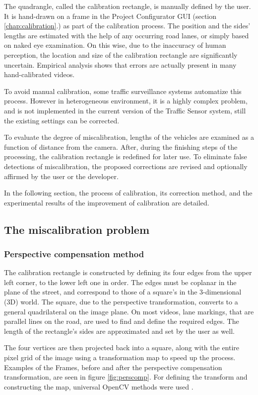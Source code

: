 The quadrangle, called the calibration rectangle, is manually defined by the user.
It is hand-drawn on a frame in the Project Configurator GUI (section \ref{chap:calibration}.) as part of the calibration process.
The position and the sides' lengths are estimated with the help of any occurring road lanes, or simply based on naked eye examination.
On this wise, due to the inaccuracy of human perception, the location and size of the calibration rectangle are significantly uncertain.
Empirical analysis shows that errors are actually present in many hand-calibrated videos.

To avoid manual calibration, some traffic surveillance systems automatize this process.
However in heterogeneous environment, it is a highly complex problem, and is not implemented in the current version of the Traffic Sensor system, still the existing settings can be corrected.

To evaluate the degree of miscalibration, lengths of the vehicles are examined as a function of distance from the camera.
After, during the finishing steps of the processing, the calibration rectangle is redefined for later use.
To eliminate false detections of miscalibration, the proposed corrections are revised and optionally affirmed by the user or the developer.

In the following section, the process of calibration, its correction method, and the experimental results of the improvement of calibration are detailed.

\subsection{The miscalibration problem}
\subsubsection{Perspective compensation method}
The calibration rectangle is constructed by defining its four edges from the upper left corner, to the lower left one in order.
The edges must be coplanar in the plane of the street, and correspond to those of a square's in the 3-dimensional (3D) world.
The square, due to the perspective transformation, converts to a general quadrilateral on the image plane.
On most videos, lane markings, that are parallel lines on the road, are used to find and define the required edges.
The length of the rectangle's sides are approximated and set by the user as well.

The four vertices are then projected back into a square, along with the entire pixel grid of the image using a transformation map to speed up the process.
Examples of the Frames, before and after the perspective compensation transformation, are seen in figure \ref{fig:perscomp}.
For defining the transform and constructing the map, universal OpenCV methods were used \cite{PersTrans, WrapPers}.

